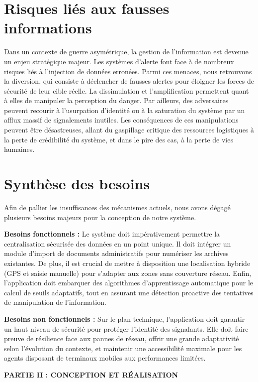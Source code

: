 \documentclass[12pt,a4paper]{article}
\begin{document}
\section{Risques liés aux fausses informations}
Dans un contexte de guerre asymétrique, la gestion de l'information est devenue un enjeu stratégique majeur. Les systèmes d'alerte font face à de nombreux risques liés à l'injection de données erronées. Parmi ces menaces, nous retrouvons la diversion, qui consiste à déclencher de fausses alertes pour éloigner les forces de sécurité de leur cible réelle. La dissimulation et l'amplification permettent quant à elles de manipuler la perception du danger. Par ailleurs, des adversaires peuvent recourir à l'usurpation d'identité ou à la saturation du système par un afflux massif de signalements inutiles. Les conséquences de ces manipulations peuvent être désastreuses, allant du gaspillage critique des ressources logistiques à la perte de crédibilité du système, et dans le pire des cas, à la perte de vies humaines.

\section{Synthèse des besoins}
Afin de pallier les insuffisances des mécanismes actuels, nous avons dégagé plusieurs besoins majeurs pour la conception de notre système. 

\textbf{Besoins fonctionnels :} Le système doit impérativement permettre la centralisation sécurisée des données en un point unique. Il doit intégrer un module d'import de documents administratifs pour numériser les archives existantes. De plus, il est crucial de mettre à disposition une localisation hybride (GPS et saisie manuelle) pour s'adapter aux zones sans couverture réseau. Enfin, l'application doit embarquer des algorithmes d'apprentissage automatique pour le calcul de seuils adaptatifs, tout en assurant une détection proactive des tentatives de manipulation de l'information.

\textbf{Besoins non fonctionnels :} Sur le plan technique, l'application doit garantir un haut niveau de sécurité pour protéger l'identité des signalants. Elle doit faire preuve de résilience face aux pannes de réseau, offrir une grande adaptativité selon l'évolution du contexte, et maintenir une accessibilité maximale pour les agents disposant de terminaux mobiles aux performances limitées.

\newpage
\vspace*{\fill}
\begin{center}
    \Huge \textbf{PARTIE II : CONCEPTION ET RÉALISATION}
\end{center}
\vspace*{\fill}
\newpage
\end{document}
